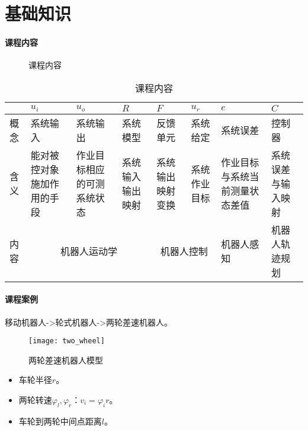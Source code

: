 \documentclass[
12pt, %
a4paper, 
oneside, %
headinclude,footinclude, %
]{scrartcl}
\title{\normalfont\spacedallcaps{智能工程}}
\date{}
\begin{document}
\maketitle
\newpage
\hypertarget{toc}{}
\tableofcontents 
\newpage
\listoffigures
\listoftables
\listoftips
\newpage
\section{基础知识}
\paragraph{课程内容}
\begin{figure}[H]
\centering
{} \quad
{}
\caption[课程内容]{课程内容}
\end{figure}

\begin{table}[hbt]
\caption{课程内容}
\centering
\begin{tabular}{|p{0.5cm}|p{2cm}|p{2cm}|p{2cm}|p{2cm}|p{2cm}|p{2cm}|p{2cm}|}
\hline
& $ u_i $ & $ u_o $ & $ R $ & $ F $ & $ u_r $ & $ e $ & $ C $ \\
\hline
概念 & 系统输入 & 系统输出 & 系统模型 & 反馈单元 & 系统给定 & 系统误差 & 控制器 \\
\hline
含义 & 能对被控对象施加作用的手段 & 作业目标相应的可测系统状态 & 系统输入输出映射 & 系统输出映射变换 & 系统作业目标 & 作业目标与系统当前测量状态差值 & 系统误差与输入映射 \\
\hline
内容 & \multicolumn{3}{c|}{机器人运动学} & \multicolumn{2}{c|}{机器人控制} & 机器人感知 & 机器人轨迹规划 \\
\hline
\end{tabular}
\end{table}
\paragraph{课程案例}\label{sec:two_wheel}
移动机器人->轮式机器人->两轮差速机器人。
\begin{figure}[H]
\centering 
\texttt{[image: two\_wheel]} 
\caption[两轮差速机器人模型]{两轮差速机器人模型}
\end{figure}
\begin{itemize}
\item 车轮半径$ r $。
\item 两轮转速$ \varphi_l,\varphi_r $：$ v_i = \varphi_i r $。
\item 车轮到两轮中间点距离$ l $。
\end{itemize}
\end{document}
